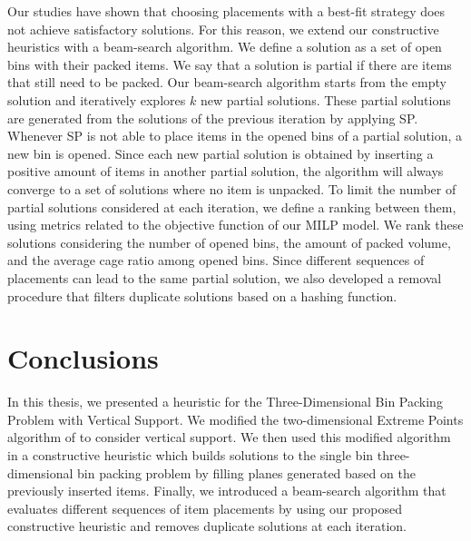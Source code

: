 \documentclass[11pt,a4paper,twocolumn]{article}
\begin{document}
Our studies have shown that choosing placements with a best-fit strategy does not achieve satisfactory solutions. For this reason, we extend our constructive heuristics with a beam-search algorithm. 
We define a solution as a set of open bins with their packed items. We say that a solution is partial if there are items that still need to be packed.
Our beam-search algorithm starts from the empty solution and iteratively explores $k$ new partial solutions.
These partial solutions are generated from the solutions of the previous iteration by applying SP. 
Whenever SP is not able to place items in the opened bins of a partial solution, a new bin is opened.
Since each new partial solution is obtained by inserting a positive amount of items in another partial solution, the algorithm will always converge to a set of solutions where no item is unpacked.
To limit the number of partial solutions considered at each iteration, we define a ranking between them, using metrics related to the objective function of our MILP model.
We rank these solutions considering the number of opened bins, the amount of packed volume, and the average cage ratio among opened bins.
Since different sequences of placements can lead to the same partial solution, we also developed a removal procedure that filters duplicate solutions based on a hashing function.


\section{Conclusions}
In this thesis, we presented a heuristic for the Three-Dimensional Bin Packing Problem with Vertical Support.
We modified the two-dimensional Extreme Points algorithm of \citet{crainic2008extreme} to consider vertical support.
We then used this modified algorithm in a constructive heuristic which builds solutions to the single bin three-dimensional bin packing problem by filling planes generated based on the previously inserted items.
Finally, we introduced a beam-search algorithm that evaluates different sequences of item placements by using our proposed constructive heuristic and removes duplicate solutions at each iteration.
\end{document}
